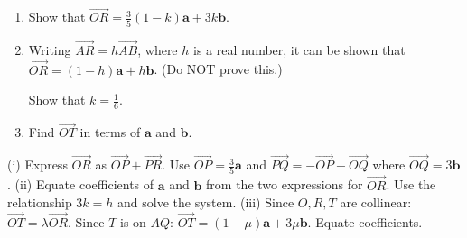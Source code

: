 \begin{problem}
\begin{center}
\end{center}

\begin{enumerate}[label=(\roman*)]
    \item Show that $\overrightarrow{OR} = \frac{3}{5}(1-k)\mathbf{a} + 3k\mathbf{b}$.
    
    \item Writing $\overrightarrow{AR} = h\overrightarrow{AB}$, where $h$ is a real number, it can be shown that $\overrightarrow{OR} = (1-h)\mathbf{a} + h\mathbf{b}$. (Do NOT prove this.)
    
    Show that $k = \frac{1}{6}$.

    \item Find $\overrightarrow{OT}$ in terms of $\mathbf{a}$ and $\mathbf{b}$.
\end{enumerate}
\end{problem}

\begin{hint}
(i) Express $\overrightarrow{OR}$ as $\overrightarrow{OP} + \overrightarrow{PR}$. Use $\overrightarrow{OP} = \frac{3}{5}\mathbf{a}$ and $\overrightarrow{PQ} = -\overrightarrow{OP} + \overrightarrow{OQ}$ where $\overrightarrow{OQ} = 3\mathbf{b}$.
(ii) Equate coefficients of $\mathbf{a}$ and $\mathbf{b}$ from the two expressions for $\overrightarrow{OR}$. Use the relationship $3k = h$ and solve the system.
(iii) Since $O, R, T$ are collinear: $\overrightarrow{OT} = \lambda\overrightarrow{OR}$. Since $T$ is on $AQ$: $\overrightarrow{OT} = (1-\mu)\mathbf{a} + 3\mu\mathbf{b}$. Equate coefficients.
\end{hint}

